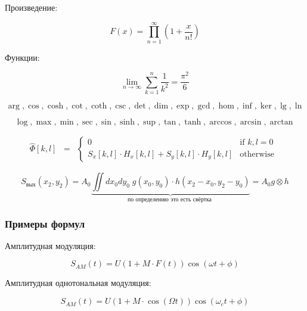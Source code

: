 \documentclass[
  a4paper,
]{book}
\theoremstyle{definition}
\theoremstyle{definition}
\theoremstyle{definition}
\theoremstyle{definition}
\theoremstyle{remark}
\begin{document}
Произведение:

\begin{equation}
F(x)= \prod_{n=1}^{\infty}\left(1 + \frac{x}{n!} \right)
\end{equation}

Функции:

\begin{equation}
    \lim_{n \to \infty}
    \sum_{k=1}^n \frac{1}{k^2}
    = \frac{\pi^2}{6}
\end{equation}

\begin{equation}
\arg, \cos, \cosh, \cot, \coth, \csc,\det, \dim, \exp, \gcd, \hom, \inf, \ker, \lg, \ln
\end{equation}

\begin{equation}
\log, \max, \min, \sec, \sin, \sinh, \sup,\tan, \tanh, \arccos, \arcsin, \arctan
\end{equation}

\begin{equation}
    \begin{matrix}
    \hat{\Phi}[k,l] & =
    & \left\{
    \begin{matrix}
    0 & \mbox{if } k,l = 0 \\
    S_x[k,l]\cdot H_x[k,l] + S_y[k,l]\cdot H_y[k,l] & \mbox{otherwise }
    \end{matrix} \right.
    \end{matrix}
\end{equation}

\begin{equation}
S_{\text{вых}}(x_2, y_2) = A_0 \underbrace{\iint dx_0 dy_0 \; g(x_0, y_0) \cdot h(x_2-x_0, y_2 -y_0)}_{\text{по определению это есть свёртка }} = A_0 g \otimes h
\end{equation}

\subsubsection{Примеры формул}\label{markdown-syntax-math-examples}

Амплитудная модуляция:

\begin{equation}
S_{AM}(t)=U(1+M \cdot F(t)) \cos{(\omega t+\phi)}
\end{equation}

Амплитудная однотональная модуляция:

\begin{equation}
S_{AM}(t)=U(1+M \cdot \cos{(\Omega t)}) \cos{(\omega_{c} t+\phi)}
\end{equation}
\end{document}
